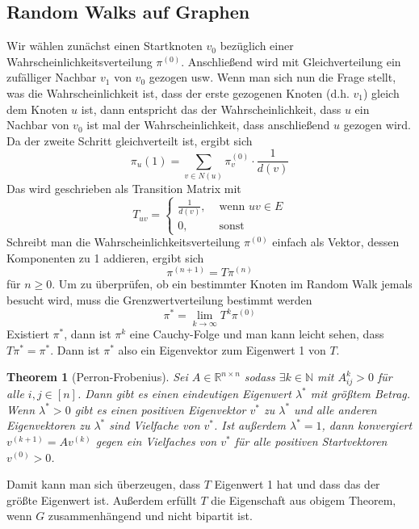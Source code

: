 \documentclass[a4paper, 12pt]{article}
\theoremstyle{plain}
\newtheorem{theorem}{Theorem}[subsection] %
\theoremstyle{definition}
\theoremstyle{lemma}
\theoremstyle{remark}
\theoremstyle{corollary}
\theoremstyle{example}
\begin{document}
	\subsection{Random Walks auf Graphen}
	Wir wählen zunächst einen Startknoten $v_0$ bezüglich einer Wahrscheinlichkeitsverteilung $\pi^{(0)}$. Anschließend wird mit Gleichverteilung ein zufälliger Nachbar $v_1$ von $v_0$ gezogen usw. Wenn man sich nun die Frage stellt, was die Wahrscheinlichkeit ist, dass der erste gezogenen Knoten (d.h. $v_1$) gleich dem Knoten $u$ ist, dann entspricht das der Wahrscheinlichkeit, dass $u$ ein Nachbar von $v_0$ ist mal der Wahrscheinlichkeit, dass anschließend $u$ gezogen wird. Da der zweite Schritt gleichverteilt ist, ergibt sich \[\pi_u(1) = \sum_{v \in N(u)} \pi_v^{(0)} \cdot \frac{1}{d(v)}\] Das wird geschrieben als Transition Matrix mit \[T_{uv} = \begin{cases}
		\frac{1}{d(v)}, & \text{ wenn } uv \in E\\
		0, & \text{ sonst}
	\end{cases}\]
	Schreibt man die Wahrscheinlichkeitsverteilung $\pi^{(0)}$ einfach als Vektor, dessen Komponenten zu 1 addieren, ergibt sich \[\pi^{(n+1)} = T\pi^{(n)}\] für $n\geq 0$. Um zu überprüfen, ob ein bestimmter Knoten im Random Walk jemals besucht wird, muss die Grenzwertverteilung bestimmt werden \[\pi^* = \lim_{k \to \infty} T^k\pi^{(0)}\]
	Existiert $\pi^*$, dann ist $\pi^{k}$ eine Cauchy-Folge und man kann leicht sehen, dass $T\pi^* = \pi^*$. Dann ist $\pi^*$ also ein Eigenvektor zum Eigenwert 1 von $T$.
	\begin{theorem}[Perron-Frobenius]
		\label{thm: PF}
		Sei $A \in \mathbb{R}^{n \times n}$ sodass $\exists k \in \mathbb{N}$ mit $A_{ij}^k > 0$ für alle $i,j \in [n]$. Dann gibt es einen eindeutigen Eigenwert $\lambda^*$ mit größtem Betrag. Wenn $\lambda^* >0$ gibt es einen positiven Eigenvektor $v^*$ zu $\lambda^*$ und alle anderen Eigenvektoren zu $\lambda^*$ sind Vielfache von $v^*$. Ist außerdem $\lambda^* = 1$, dann konvergiert $v^{(k+1)} = Av^{(k)}$ gegen ein Vielfaches von $v^*$ für alle positiven Startvektoren $v^{(0)} > 0$.
	\end{theorem}
	Damit kann man sich überzeugen, dass $T$ Eigenwert 1 hat und dass das der größte Eigenwert ist. Außerdem erfüllt $T$ die Eigenschaft aus obigem Theorem, wenn $G$ zusammenhängend und nicht bipartit ist.
\end{document}
